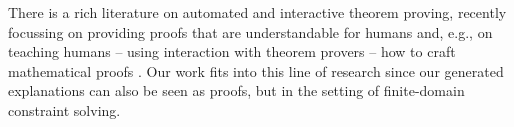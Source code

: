 

There is a rich literature on automated and interactive theorem proving, recently focussing on providing proofs that are understandable for humans \cite{Ganesalingam2017} and, e.g.,  on teaching humans -- using interaction with theorem provers -- how to craft mathematical proofs  \cite{DBLP:conf/icml/YangD19}. 
Our work fits into this line of research since our generated explanations can also be seen as proofs, but in the setting of finite-domain constraint solving.




